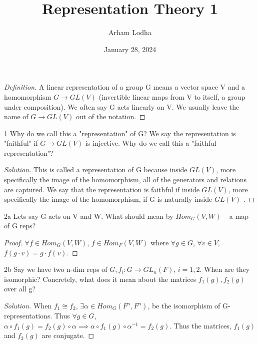 \documentclass{article}
\newenvironment{solution}
{\renewcommand\qedsymbol{$\blacksquare$}\begin{proof}[Solution]}
{\end{proof}}
\newenvironment{definition}
{\renewcommand\qedsymbol{$\blacksquare$}\begin{proof}[Definition]}
{\end{proof}}
\begin{document}
\title{Representation Theory 1}
\author{Arham Lodha}%
\date{January 28, 2024}%
\maketitle

\begin{definition}
    A linear representation of a group G means a vector space V and a homomorphism $G \to GL(V)$ (invertible linear maps from V to itself, a group under composition). 
    We often say G acts linearly on V.  We usually leave the name of $G \to GL(V)$ out of the notation.
\end{definition}

\bigskip

\begin{PROB}{1}\label{Problem 1.}
    Why do we call this a "representation" of G? We say the representation is "faithful" if $G \to GL(V)$ is injective. Why do we call this a "faithful representation"?
\end{PROB}
\begin{solution}
    This is called a representation of G because inside $GL(V)$, more specifically the image of the homomorphism, all of the generators and relations are captured. We say that the representation is faithful if inside $GL(V)$, more specifically the image of the homomorphism, if G is naturally inside $GL(V)$ .  
\end{solution}

\bigskip

\begin{PROB}{2a}\label{Problem 2a.}
    Lets say G acts on V and W. What should mean by $Hom_G(V,W)$ -- a map of G reps?
\end{PROB}
\begin{proof}
    $\forall f \in Hom_G(V, W)$, $f \in Hom_F(V, W)$ where $\forall g \in G$, $\forall v \in V$, $f(g \cdot v) = g \cdot f(v)$.    
\end{proof}

\begin{PROB}{2b}\label{Problem 2b.}
    Say we have two n-dim reps of $G, f_i: G \to GL_n(F)$, $i = 1, 2$. When are they isomorphic? Concretely, what does it mean about the matrices $f_1(g), f_2(g)$ over all g?
\end{PROB}
\begin{solution}
    When $f_1 \cong f_2$,  $\exists \alpha \in Hom_G(F^n, F^n)$, be the isomorphism of G-representations. Thus $\forall g \in G$, $\alpha \circ f_1(g) = f_2(g) \circ \alpha \implies \alpha \circ f_1(g) \circ \alpha^{-1} = f_2(g)$. Thus the matrices, $f_1(g)$ and $f_2(g)$ are conjugate.   
\end{solution}
\end{document}
